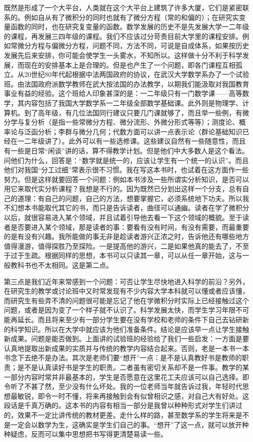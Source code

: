 既然是形成了一个大平台，人类就在这个大平台上建筑了许多大厦，它们是紧密联系的。例如自从有了微积分的同时也就有了微分方程（常的和偏的）；在研究实变量函数的同时，也在研究复变量的函数。数学发展的历史不是先发展大学一二年级的课程，再发展三四年级的课程。我们不应该过分苛责目前大学里的课程安排。例如常微分方程与偏微分方程，问题不同，方法不同，可说是自成体系，如果按历史发展先后来安排，你可能会使学生一头雾水，不知所以。这样做十分不利于科学发展，而现在的安排基本上是合理的。但是也产生了一个问题，即各门课程互相孤立。从20世纪80年代起根据中法两国政府的协议，在武汉大学数学系办了一个试验班。由法国政府派数学教师在武大按法国的办法教学，以期我们能汲取对我国教育事业有益的经验。这个班给人印象甚深的是：一二年级只有一门数学课——高等数学，其内容包括了我国大学数学系一二年级全部数学基础课。此外则是物理学、计算机。到了高年级，有几位法国同行建议只要几门课就够了，而且举一些例，有微分学与复分析（是指一些常微分方程、微分流形、外微分形式等等）；测度论、概率论与泛函分析；李群与微分几何；代数方面可以讲一点表示论（群论基础知识已经在一二年级讲了）。此外可以有一些选修课。这些建议自然有一些随意性，而且有一些是日常“闲谈”讲的话，算不得教学计划。但是他们中大多数人是这个看法。问他们为什么，回答是：“数学就是统一的，应该让学生有一个统一的认识”。而且他们对我国“分工过细”常表示很不习惯。我在写这本书时，也试着在这方面作一些努力。但是这样就要回答一个问题：例如本书涉及一些所谓实分析知识，是否可以用它来取代实分析课程？我想是不行的。因为既然已分划出这样一个分支，总有自己的道理：有自己的问题，自己的方法，想要掌握它，必须系统地下功夫。所以我不幻想本书能取代其它的书，而只是告诉读者，曲径可以通幽。读者在学了微积分以后，就很容易进入某个领域，并且试着引导他去看一下这个领域的概貌。至于读者是否要进入某个领域，那是读者的事：要看有没有时间，有没有需要，而最重要的是有没有兴趣。我所能做的事无非是趁读者游兴正浓之时，告诉他还有哪些地方值得漫游，值得探胜乃至探险。一是提高他的游兴，二是如果他真的能去了，不至于过于生疏。根据同样的思想，本书可以只读其一章，可以从任一章开始，这与一般教科书也不太相同。这是第二点。

第三点是我们近年来常感到一个问题：可否让学生尽快地进入科学的前沿？另外，在研究生的教学或讨论班中又时常发现有不少内容大学本科就可以懂或者应该懂，而研究生有些弄不清的问题很可能是忘记了他在学微积分时实际上已经接触过这个问题，或者是因为变了一个样子就不认识了。科学发展太快，而学生学习年限不可能再延长。而且将来至少有一部分学生要在没有学校和老师的条件下自己去钻研新的科学知识。所以在大学中就应该为他们准备条件。结论是应该早一点让学生接触新成果。问题是能否做到。上面讲的试验班的经验给了我们一些启发：一方面是要认真地提取出新成果的实质并与传统的教学内容结合起来。否则，老是一本书一本书念下去绝不是办法。其次是老师们要“想开”一点：是不是认真教好书是教师的职责；是不是认真读好书是学生的职责。二者虽有密切关系却不是一件事。教学的某一部分内容时常并非最基本的，学生是否愿意在这里花工夫应该可以自己选择。即令听了不甚了然，至少没有什么坏处。我的一位老师当年就告诉过我，年轻时代思想最敏锐，即令一时不懂，将来再接触到会有似曾相识之感，对自己大有好处。这段话是千真万确的。这本书的内容有相当一部分是我曾以种种形式对学生们讲过的，效果不一定比讲传统的教材更差。走什么样的路，甚至数学系的学生将来是不是一定会以数学为生，这确实是学生们自己的事。“想开”了这一点，就可以放开种种疑虑，反而可以集中思想把书写得更清楚易读一些。

